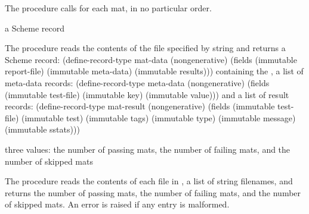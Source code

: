 \documentclass[letterpaper,11pt,twoside,final]{article}
\begin{document}
The  procedure calls  for each mat, in no particular order.

\begin{procedure}
\end{procedure}
\returns{} a Scheme record

The  procedure reads the contents of the file
specified by string  and returns a Scheme record:
\codebegin
(define-record-type mat-data
  (nongenerative)
  (fields
    (immutable report-file)
    (immutable meta-data)
    (immutable results)))
\codeend
containing the , a list of meta-data records:
\codebegin
(define-record-type meta-data
  (nongenerative)
  (fields
   (immutable test-file)
   (immutable key)
   (immutable value)))
\codeend
and a list of result records:
\codebegin
(define-record-type mat-result
  (nongenerative)
  (fields
   (immutable test-file)
   (immutable test)
   (immutable tags)
   (immutable type)
   (immutable message)
   (immutable sstats)))
\codeend

\begin{procedure}
\end{procedure}
\returns{} three values: the number of passing mats, the number of
failing mats, and the number of skipped mats

The  procedure reads the contents of each file in
, a list of string filenames, and returns the number of
passing mats, the number of failing mats, and the number of skipped mats.
An error is raised if any
entry is malformed.
\end{document}
